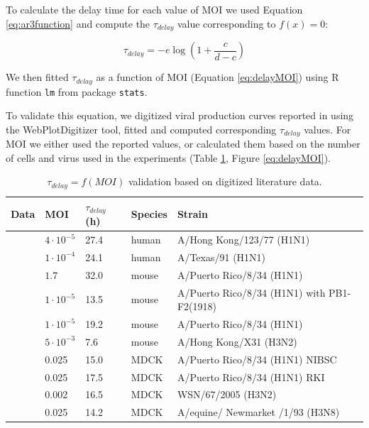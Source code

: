 To calculate the delay time for each value of MOI we used Equation \ref{eq:ar3function} and compute the $\tau_{delay}$ value corresponding to $f(x) = 0$:

\begin{equation}
\tau_{delay} = -e\log(1+\frac{c}{d-c})
\end{equation}

We then fitted $\tau_{delay}$ as a function of MOI (Equation \ref{eq:delayMOI}) using R function \texttt{lm} from package \texttt{stats}.

To validate this equation, we digitized viral production curves reported in \cite{baccam2006kinetics, handel2007neuraminidase, handel2010towards, smith2011effect, miao2010quantifying, mohler2005mathematical} using the WebPlotDigitizer \cite{Rohatgi2020} tool, fitted and computed corresponding $\tau_{delay}$ values. For MOI we either used the reported values, or calculated them based on the number of cells and virus used in the experiments (Table \ref{table:delayTauValidation}, Figure \ref{eq:delayMOI}).

\begin{table}[h!]
\centering
\caption[$\tau_{delay} = f(MOI)$ validation]{$\tau_{delay} = f(MOI)$ validation based on digitized literature data.}
\label{table:delayTauValidation}

\begin{tabular}{p{2cm} p{2cm} p{2cm} p{2cm} p{4cm}}
\hline 
\textbf{Data} & \textbf{MOI} & \textbf{$\tau_{delay}$ (h)} &  \textbf{Species} & \textbf{Strain}\\
\hline
\cite{baccam2006kinetics} & $4\cdot 10^{-5}$ & 27.4 & human & A/Hong Kong/123/77 (H1N1)\\
\cite{handel2007neuraminidase} & $1\cdot 10^{-4}$ & 24.1 & human & A/Texas/91 (H1N1)\\
\hline
\cite{handel2010towards} & $1.7$ & 32.0 & mouse & A/Puerto Rico/8/34 (H1N1)\\
\cite{smith2011effect} & $1\cdot 10^{-5}$ & 13.5 & mouse & A/Puerto Rico/8/34 (H1N1) with PB1-F2(1918)\\
\cite{smith2011effect} & $1\cdot 10^{-5}$ & 19.2 & mouse & A/Puerto Rico/8/34 (H1N1)\\
\cite{miao2010quantifying} & $5\cdot 10^{-3}$ & 7.6 & mouse & A/Hong  Kong/X31 (H3N2)\\
\hline
\cite{schulze2009infection} & 0.025 & 15.0 & MDCK & A/Puerto Rico/8/34 (H1N1) NIBSC\\
\cite{schulze2009infection} & 0.025 & 17.5 & MDCK & A/Puerto Rico/8/34 (H1N1) RKI\\
\cite{schulze2009infection} & 0.002 & 16.5 & MDCK & WSN/67/2005 (H3N2)\\
\cite{mohler2005mathematical} & 0.025 & 14.2 & MDCK & A/equine/ Newmarket /1/93 (H3N8)\\
\hline
\end{tabular}
\end{table}

